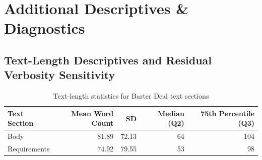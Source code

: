 \section{Additional Descriptives \& Diagnostics}\label{app:add_graphs_diags}






\subsection{Text-Length Descriptives and Residual Verbosity Sensitivity}
\label{app:verbosity_diagnostics}

\begin{table}[h]
    \centering
    \caption{Text-length statistics for Barter Deal text sections}
    \label{tab:barter_text_length_stats}
    \begin{tabular}{lrrrr}
    \toprule
    Text Section & Mean Word Count & SD & Median (Q2) & 75th Percentile (Q3) \\
    \midrule
    Body & 81.89 & 72.13 & 64 & 104 \\
    Requirements & 74.92 & 79.55 & 53 & 98 \\
    \bottomrule
    \end{tabular}
\end{table}

